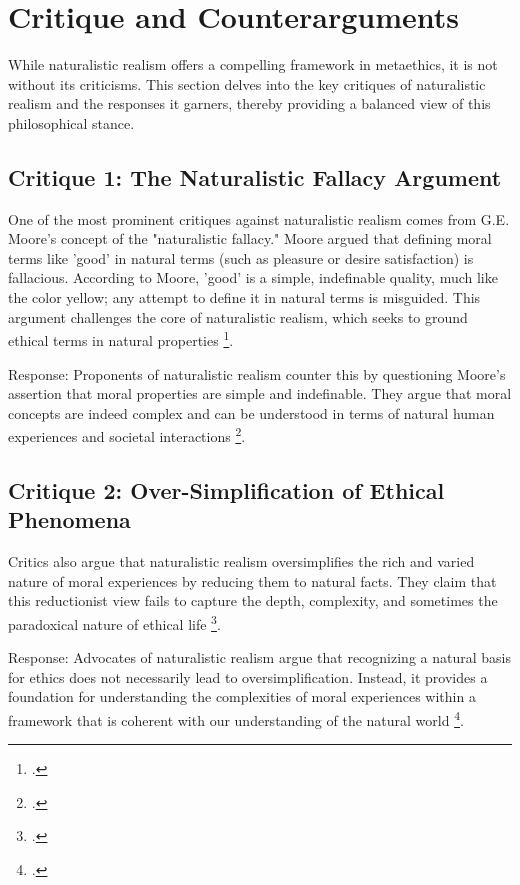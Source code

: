 \documentclass[12pt,a4paper]{article}
\begin{document}
\section{Critique and Counterarguments}

While naturalistic realism offers a compelling framework in metaethics, it is not without its criticisms. This section delves into the key critiques of naturalistic realism and the responses it garners, thereby providing a balanced view of this philosophical stance.

\subsection{Critique 1: The Naturalistic Fallacy Argument}
One of the most prominent critiques against naturalistic realism comes from G.E. Moore's concept of the "naturalistic fallacy." Moore argued that defining moral terms like 'good' in natural terms (such as pleasure or desire satisfaction) is fallacious. According to Moore, 'good' is a simple, indefinable quality, much like the color yellow; any attempt to define it in natural terms is misguided. This argument challenges the core of naturalistic realism, which seeks to ground ethical terms in natural properties \footcite[291-311]{Baldwin2006}.

Response: Proponents of naturalistic realism counter this by questioning Moore's assertion that moral properties are simple and indefinable. They argue that moral concepts are indeed complex and can be understood in terms of natural human experiences and societal interactions \footcite[532-547]{Dreier2018}.

\subsection{Critique 2: Over-Simplification of Ethical Phenomena}
Critics also argue that naturalistic realism oversimplifies the rich and varied nature of moral experiences by reducing them to natural facts. They claim that this reductionist view fails to capture the depth, complexity, and sometimes the paradoxical nature of ethical life \footcite[843-851]{Joyce2014}.

Response: Advocates of naturalistic realism argue that recognizing a natural basis for ethics does not necessarily lead to oversimplification. Instead, it provides a foundation for understanding the complexities of moral experiences within a framework that is coherent with our understanding of the natural world \footcite[610-624]{Copp1991}.
\end{document}

